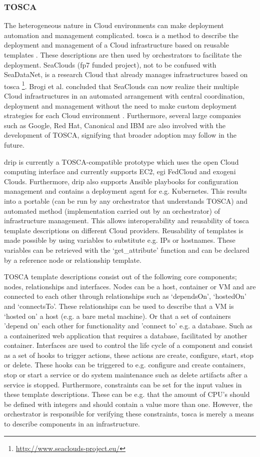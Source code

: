\documentclass[conference]{IEEEtran}
\begin{document}
\subsubsection{TOSCA}
The heterogeneous nature in Cloud environments can make deployment automation and management complicated. \gls{tosca} is a method to describe the deployment and management of a Cloud infrastructure based on reusable templates \cite{tosca-standard}. These descriptions are then used by orchestrators to facilitate the deployment. SeaClouds (\gls{fp7} funded project), not to be confused with SeaDataNet, is a research Cloud that already manages infrastructures based on \gls{tosca} \footnote{\url{http://www.seaclouds-project.eu/}}. Brogi et al. concluded that SeaClouds can now realize their multiple Cloud infrastructures in an automated arrangement with central coordination, deployment and management without the need to make custom deployment strategies for each Cloud environment \cite{brogi2015adaptive}. Furthermore, several large companies such as Google, Red Hat, Canonical and IBM are also involved with the development of TOSCA, signifying that broader adoption may follow in the future.

\gls{drip} is currently a TOSCA-compatible prototype which uses the open Cloud computing interface and currently supports EC2, \gls{egi} FedCloud and \gls{exogeni} Clouds. Furthermore, \gls{drip} also supports Ansible playbooks for configuration management and contains a deployment agent for e.g. Kubernetes. This results into a portable (can be run by any orchestrator that understands TOSCA) and automated method (implementation carried out by an orchestrator) of infrastructure management. This allows interoperability and reusability of \gls{tosca} template descriptions on different Cloud providers. Reusability of templates is made possible by using variables to substitute e.g. IPs or hostnames. These variables can be retrieved with the `get\_attribute' function and can be declared by a reference node or relationship template.

TOSCA template descriptions consist out of the following core components; nodes, relationships and interfaces. Nodes can be a host, container or VM and are connected to each other through relationships such as `dependsOn', `hostedOn' and `connectsTo'. These relationships can be used to describe that a VM is `hosted on' a host (e.g. a bare metal machine). Or that a set of containers 'depend on' each other for functionality and 'connect to' e.g. a database. Such as a containerized web application that requires a database, facilitated by another container. Interfaces are used to control the life cycle of a component and consist as a set of hooks to trigger actions, these actions are create, configure, start, stop or delete. These hooks can be triggered to e.g. configure and create containers, stop or start a service or do system maintenance such as delete artifacts after a service is stopped. Furthermore, constraints can be set for the input values in these template descriptions. These can be e.g. that the amount of CPU's should be defined with integers and should contain a value more than one. However, the orchestrator is responsible for verifying these constraints, \gls{tosca} is merely a means to describe components in an infrastructure.
\end{document}
